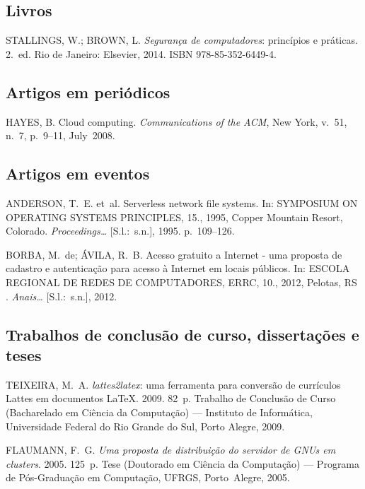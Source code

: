\documentclass{ifsultcc}
\begin{document}
\begin{flushleft}
\subsection{Livros}
\begin{list}{}
	\item STALLINGS, W.;
  BROWN, L\@. \emph{Segurança de computadores}: princípios e práticas.
  2.~ed. Rio de Janeiro: Elsevier, 2014. ISBN 978-85-352-6449-4.
\end{list}

\subsection{Artigos em periódicos}
\begin{list}{}
	\item HAYES, B\@. Cloud computing.
  \emph{Communications of the ACM}, New York, v.~51, n.~7, p.~9--11, July~2008.
\end{list}

\subsection{Artigos em eventos}
\begin{list}{}
	\item ANDERSON, T.~E.
  et~al\@. Serverless network file systems. In: SYMPOSIUM ON OPERATING SYSTEMS
  PRINCIPLES, 15., 1995, Copper Mountain Resort, Colorado.
  \emph{Proceedings{\ldots}} [S.l.:~s.n.], 1995. p.~109--126.
  	\item BORBA, M.~de;
  {\'A}VILA, R.~B\@. Acesso gratuito a {I}nternet - uma proposta de cadastro e
  autentica{\c{c}}{\~a}o para acesso {\`a} {I}nternet em locais p{\'u}blicos.
  In: ESCOLA REGIONAL DE REDES DE COMPUTADORES, ERRC, 10., 2012, Pelotas, RS
 \@. \emph{Anais{\ldots}} [S.l.:~s.n.], 2012.
\end{list}

\subsection{Trabalhos de conclusão de curso, dissertações e teses}
\begin{list}{}
	\item TEIXEIRA, M.~A\@.
  \emph{lattes2latex}: uma ferramenta para conversão de currículos {L}attes
  em documentos {L}a{T}e{X}. 2009. 82~p. Trabalho de Conclus{\~a}o de Curso
  (Bacharelado em Ci{\^e}ncia da Computa{\c{c}}{\~a}o) --- Instituto de
  Inform{\'a}tica, Universidade Federal do Rio Grande do Sul, Porto Alegre,
  2009.\\[4ex]
  	\item FLAUMANN, F.~G\@. \emph{Uma
  proposta de distribuição do servidor de {GNU}s em clusters}. 2005. 125~p.
  Tese (Doutorado em Ci{\^e}ncia da Computa{\c{c}}{\~a}o) --- Programa de
  Pós-Graduação em Computação, UFRGS, Porto~Alegre, 2005.
\end{list}


\end{flushleft}
\end{document}
